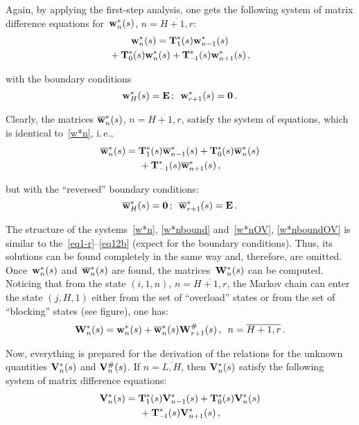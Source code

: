 \begin{multicols}{2}
Again, by applying the first-step analysis, one gets 
the following system of matrix difference equations 
for~$\mathbf{w}^*_n(s)$, $n=\overline{H+1,r}$:
\begin{multline}
\label{w*n}
\mathbf{w}^*_n(s)
= \mathbf{T}^*_1(s)  \mathbf{w}^*_{n-1}(s)\\
{} +  \mathbf{T}^*_0(s) \mathbf{w}^*_n(s) + 
\mathbf{T}^*_{-\!1}(s)  \mathbf{w}^*_{n+1}(s)\,,
\end{multline}

\noindent with the boundary conditions
\begin{equation}
\label{w*nbound}
\mathbf{w}^*_H(s)
=
\mathbf{E}\,;
\enskip  
\mathbf{w}^*_{r+1}(s)
= 
\mathbf{0}\,.
\end{equation}


\noindent Clearly, the matrices $\mathbf{\overline w}^*_n(s)$, $n=\overline{H+1,r}$,
satisfy the system of equations, which is identical to~\eqref{w*n},
i.\,e.,
\begin{multline}
\label{w*nOV} \mathbf{\overline w}^*_n(s)
= \mathbf{T}^*_1(s)  \mathbf{\overline w}^*_{n-1}(s)
+  \mathbf{T}^*_0(s) \mathbf{\overline w}^*_n(s)\\
{}+  \mathbf{T}^*_{-1}(s) 
\mathbf{\overline w}^*_{n+1}(s)\,,
\end{multline}

\noindent but with the ``reversed'' boundary conditions:
\begin{equation}
\label{w*nboundOV}
\mathbf{\overline w}^*_H(s)
= \mathbf{0}\,; \enskip  
\mathbf{\overline w}^*_{r+1}(s) =  \mathbf{E}\,.
\end{equation}

The structure of the systems~\eqref{w*n}, \eqref{w*nbound} 
and~\eqref{w*nOV}, \eqref{w*nboundOV} is
similar to the~\eqref{eq1-r}--\eqref{eq12b} (expect for the boundary conditions).
Thus, its solutions can be found completely in the same way and, therefore, are omitted.
Once~$\mathbf{w}^*_n(s)$ and~$\mathbf{\overline w}^*_n(s)$ are found, the 
matrices~$\mathbf{W}^*_n(s)$ can be computed. Noticing that from the 
state $(i,1,n)$, $n=\overline{H+1,r}$, the Markov chain can enter 
the state $(j,H,1)$ either from the set of ``overload'' states or
from the set of ``blocking'' states (see figure), one has:
$$
\mathbf{W}^*_n(s)= \mathbf{w}^*_n(s)+\mathbf{\overline w}^*_n(s)\mathbf{W}^{\#}_{r+1}(s)\,,
\enskip n=\overline{H+1,r}\,.
$$

\columnbreak

Now, everything is prepared for the derivation of
the relations for the unknown quantities $\mathbf{V}^*_n(s)$  
and $\mathbf{V}^{\#}_n(s)$. 
If $n=\overline{L,H}$, then $\mathbf{V}^*_n(s)$ satisfy the following
system of matrix difference equations:
\begin{multline}
\label{V*}
\mathbf{V}^*_n(s)
= \mathbf{T}^*_1(s)  \mathbf{V}^*_{n-1}(s) + 
\mathbf{T}^*_0(s) \mathbf{V}^*_n(s)\\
{} +  \mathbf{T}^*_{-\!1}(s)  \mathbf{V}^*_{n+1}(s)\,,
\end{multline}


\end{multicols}
